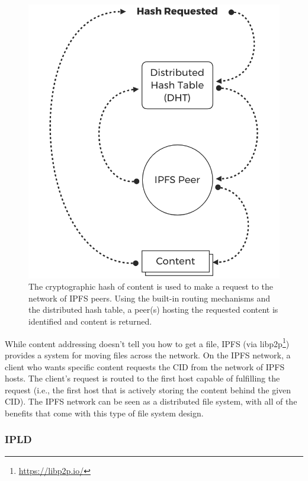 \documentclass{textile}
\begin{document}
\begin{figure}
  \includegraphics[width=\linewidth]{figures/Hash_Request.png}
  \caption{The cryptographic hash of content is used to make a request to the network of IPFS peers. Using the built-in routing mechanisms and the distributed hash table, a peer(s) hosting the requested content is identified and content is returned. }
  \label{fig:contentaddressing}
\end{figure}

While content addressing doesn't tell you how to get a file, IPFS (via libp2p\footnote{\url{https://libp2p.io/}}) provides a system for moving files across the network.  On the IPFS network, a client who wants specific content requests the CID from the network of IPFS hosts. The client's request is routed to the first host capable of fulfilling the request (i.e., the first host that is actively storing the content behind the given CID). The IPFS network can be seen as a distributed file system, with all of the benefits that come with this type of file system design.

\subsubsection{IPLD}
\end{document}
